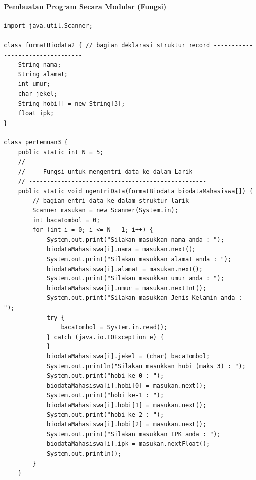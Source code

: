 \documentclass[a4paper,12pt]{article}
\begin{document}
\paragraph*{Pembuatan Program Secara Modular (Fungsi)\\}
\begin{lstlisting}
import java.util.Scanner;

class formatBiodata2 { // bagian deklarasi struktur record ---------------------------------
    String nama;
    String alamat;
    int umur;
    char jekel;
    String hobi[] = new String[3];
    float ipk;
}

class pertemuan3 {
    public static int N = 5;
    // --------------------------------------------------
    // --- Fungsi untuk mengentri data ke dalam Larik ---
    // --------------------------------------------------
    public static void ngentriData(formatBiodata biodataMahasiswa[]) {
        // bagian entri data ke dalam struktur larik ----------------
        Scanner masukan = new Scanner(System.in);
        int bacaTombol = 0;
        for (int i = 0; i <= N - 1; i++) {
            System.out.print("Silakan masukkan nama anda : ");
            biodataMahasiswa[i].nama = masukan.next();
            System.out.print("Silakan masukkan alamat anda : ");
            biodataMahasiswa[i].alamat = masukan.next();
            System.out.print("Silakan masukkan umur anda : ");
            biodataMahasiswa[i].umur = masukan.nextInt();
            System.out.print("Silakan masukkan Jenis Kelamin anda : ");
            try {
                bacaTombol = System.in.read();
            } catch (java.io.IOException e) {
            }
            biodataMahasiswa[i].jekel = (char) bacaTombol;
            System.out.println("Silakan masukkan hobi (maks 3) : ");
            System.out.print("hobi ke-0 : ");
            biodataMahasiswa[i].hobi[0] = masukan.next();
            System.out.print("hobi ke-1 : ");
            biodataMahasiswa[i].hobi[1] = masukan.next();
            System.out.print("hobi ke-2 : ");
            biodataMahasiswa[i].hobi[2] = masukan.next();
            System.out.print("Silakan masukkan IPK anda : ");
            biodataMahasiswa[i].ipk = masukan.nextFloat();
            System.out.println();
        }
    }


\end{lstlisting}
\end{document}
